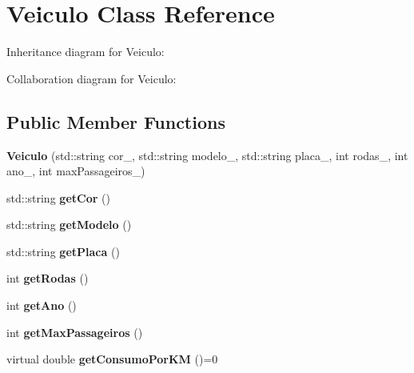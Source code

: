 \hypertarget{classVeiculo}{}\section{Veiculo Class Reference}
\label{classVeiculo}


Inheritance diagram for Veiculo\+:


Collaboration diagram for Veiculo\+:
\subsection*{Public Member Functions}
\begin{DoxyCompactItemize}
\item 
\mbox{\label{classVeiculo_af0ef5681951f80a8e2bc571c9d665509}} 
{\bfseries Veiculo} (std\+::string cor\+\_\+, std\+::string modelo\+\_\+, std\+::string placa\+\_\+, int rodas\+\_\+, int ano\+\_\+, int max\+Passageiros\+\_\+)
\item 
\mbox{\label{classVeiculo_a0f72bb9cafd180e9321d84dd94f67a13}} 
std\+::string {\bfseries get\+Cor} ()
\item 
\mbox{\label{classVeiculo_a7c73008db8e31508658cf010a4007424}} 
std\+::string {\bfseries get\+Modelo} ()
\item 
\mbox{\label{classVeiculo_af700ed20beb425a049001645c8226c88}} 
std\+::string {\bfseries get\+Placa} ()
\item 
\mbox{\label{classVeiculo_a073df2ecf8f31bf9698a2b9bd7b9d1e1}} 
int {\bfseries get\+Rodas} ()
\item 
\mbox{\label{classVeiculo_abc269de5344847211a7ba71176b61eef}} 
int {\bfseries get\+Ano} ()
\item 
\mbox{\label{classVeiculo_a1f1fac82bac1b66efe411704a14afcb1}} 
int {\bfseries get\+Max\+Passageiros} ()
\item 
\mbox{\label{classVeiculo_ae08293b5108b648e7f4cea6be731bba7}} 
virtual double {\bfseries get\+Consumo\+Por\+KM} ()=0
\item 
\mbox{\label{classVeiculo_a070d103f7ea1b22f01330dfa738ce3b3}} 

\end{DoxyCompactItemize}
